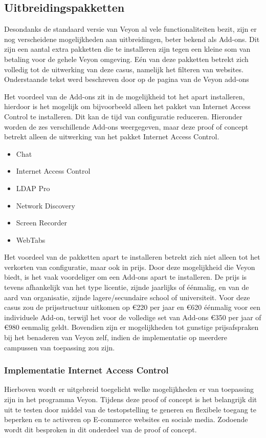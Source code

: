 \subsection{Uitbreidingspakketten}
Desondanks de standaard versie van Veyon al vele functionaliteiten bezit, zijn er nog verscheidene mogelijkheden aan uitbreidingen, beter bekend als Add-ons. Dit zijn een aantal extra pakketten die te installeren zijn tegen een kleine som van betaling voor de gehele Veyon omgeving. Eén van deze pakketten betrekt zich volledig tot de uitwerking van deze casus, namelijk het filteren van websites. Onderstaande tekst werd beschreven door \textcite{junghans-2023} op de pagina van de Veyon add-ons \newline

Het voordeel van de Add-ons zit in de mogelijkheid tot het apart installeren, hierdoor is het mogelijk om bijvoorbeeld alleen het pakket van Internet Access Control te installeren. Dit kan de tijd van configuratie reduceren. Hieronder worden de zes verschillende Add-ons weergegeven, maar deze proof of concept betrekt alleen de uitwerking van het pakket Internet Access Control. 
\begin{itemize}
    \item Chat
    \item Internet Access Control
    \item LDAP Pro
    \item Network Discovery
    \item Screen Recorder
    \item WebTabs
\end{itemize}

Het voordeel van de pakketten apart te installeren betrekt zich niet alleen tot het verkorten van configuratie, maar ook in prijs. Door deze mogelijkheid die Veyon biedt, is het vaak voordeliger om een Add-ons apart te installeren. De prijs is tevens afhankelijk van het type licentie, zijnde jaarlijks of éénmalig, en van de aard van organisatie, zijnde lagere/secundaire school of universiteit. Voor deze casus zou de prijsstructuur uitkomen op €220 per jaar en €620 éénmalig voor een individuele Add-on, terwijl het voor de volledige set van Add-ons €350 per jaar of €980 eenmalig geldt. Bovendien zijn er mogelijkheden tot gunstige prijsafspraken bij het benaderen van Veyon zelf, indien de implementatie op meerdere campussen van toepassing zou zijn. \autocite{junghans-2023} \newline

\subsubsection{Implementatie Internet Access Control}
\label{Implementatie Internet Access Control}
Hierboven wordt er uitgebreid toegelicht welke mogelijkheden er van toepassing zijn in het programma Veyon. Tijdens deze proof of concept is het belangrijk dit uit te testen door middel van de testopstelling te generen en flexibele toegang te beperken en te activeren op E-commerce websites en sociale media. Zodoende wordt dit besproken in dit onderdeel van de proof of concept. \newline

